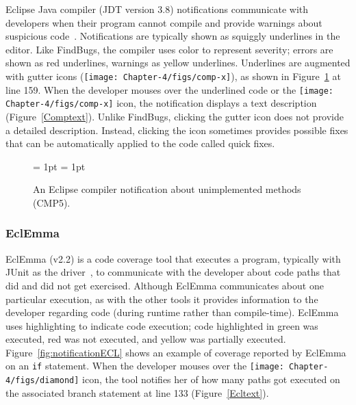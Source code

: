 Eclipse Java compiler (JDT version 3.8) notifications communicate with developers when their program cannot
compile and provide warnings about suspicious code~\cite{EclipseCompiler}.
Notifications are typically shown as squiggly underlines in the editor. Like FindBugs, the compiler uses color to represent severity; errors
are shown as red underlines, warnings as yellow underlines.
Underlines are augmented with gutter icons
(\texttt{[image: Chapter-4/figs/comp-x]}), as shown in
Figure~\ref{fig:notificationCOMP} at line 159. When the developer mouses over
the underlined code or the \texttt{[image: Chapter-4/figs/comp-x]} icon, the
notification displays a text description (Figure~\ref{Comptext}). Unlike FindBugs, clicking the gutter icon does not provide a detailed description. Instead, clicking the icon sometimes provides possible fixes that can be automatically applied to the code called quick fixes.

\begin{figure} 
\subfigcapskip = 1pt
\centering
{}
\subfigcapskip = 1pt

\caption{An Eclipse compiler notification about unimplemented methods (CMP5).}
\label{fig:notificationCOMP} 
\end{figure}

\subsubsection*{EclEmma}

EclEmma (v2.2) is a code coverage tool that executes a program, typically with JUnit
as the driver~\cite{JUnit}, to communicate with the developer about code paths that did and
did not get exercised. Although EclEmma communicates about one particular execution, 
as with the other tools it provides information to the developer regarding code 
(during runtime rather than compile-time). 
EclEmma uses highlighting to indicate code execution; code highlighted in
green was executed, red was not executed, and yellow was partially executed.
Figure~\ref{fig:notificationECL} shows an example of coverage reported by
EclEmma on an \texttt{if} statement. When the developer mouses over the
\texttt{[image: Chapter-4/figs/diamond]} icon, the tool notifies her of how many
paths got executed on the associated branch statement at line 133
(Figure~\ref{Ecltext}).

